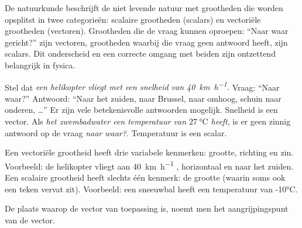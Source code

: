 \documentclass{ximera}
\begin{document}
	\author{Bart Lambregs}
    \xmsource\xmuitleg


De natuurkunde beschrijft de niet levende natuur met grootheden die worden opsplitst in twee categorieën: scalaire grootheden (scalars) en vectoriële grootheden (vectoren). 
Grootheden die de vraag kunnen oproepen: “Naar waar gericht?” zijn vectoren, grootheden waarbij die vraag geen antwoord heeft, zijn scalars. 
Dit onderscheid en een correcte omgang met beiden zijn ontzettend belangrijk in fysica.


Stel dat \textit{een helikopter vliegt met een snelheid van \SI{40}{\kilo\meter\per\hour}.} 
Vraag: “Naar waar?” Antwoord: “Naar het zuiden, naar Brussel, naar omhoog, schuin naar onderen, …” 
Er zijn vele betekenisvolle antwoorden mogelijk. 
Snelheid is een vector. 
Als \textit{het zwembadwater een temperatuur van  \(\SI{27}{\celsius}\) heeft}, is er geen zinnig antwoord op de vraag \textit{naar waar?}. 
Temperatuur is een scalar.



Een vectoriële grootheid heeft drie variabele kenmerken: grootte, richting en zin. Voorbeeld: de helikopter vliegt aan \SI{40}{\kilo\meter\per\hour} , horizontaal en naar het zuiden. 
Een scalaire grootheid heeft slechts één kenmerk: de grootte (waarin soms ook een teken vervat zit). 
Voorbeeld: een sneeuwbal heeft een temperatuur van -10°C.

De plaats waarop de vector van toepassing is, noemt men het aangrijpingspunt van de vector.






	
\end{document}

